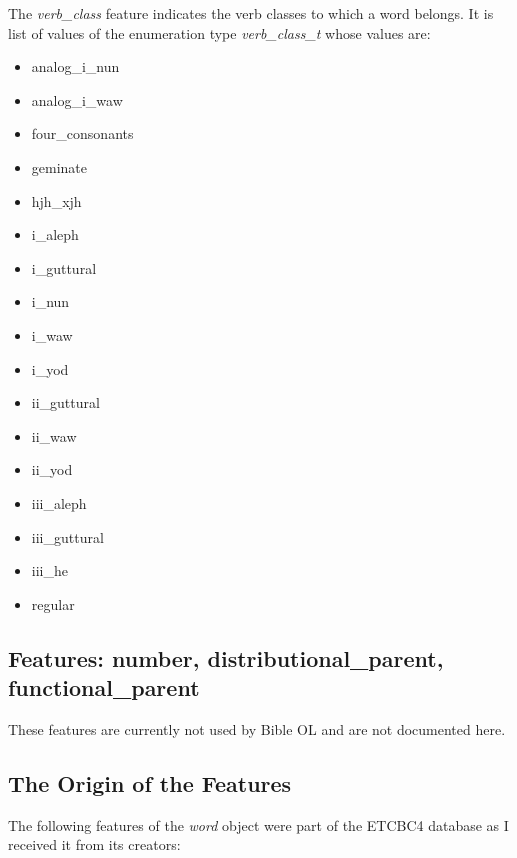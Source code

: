 \documentclass[11pt,oneside,a4paper]{memoir}
\begin{document}
The \emph{verb\_class} feature indicates the verb classes to which a word belongs. It is list of
values of the enumeration type \emph{verb\_class\_t} whose values are:

\begin{itemize}
\item analog\_i\_nun
\item analog\_i\_waw
\item four\_consonants
\item geminate
\item hjh\_xjh
\item i\_aleph
\item i\_guttural
\item i\_nun
\item i\_waw
\item i\_yod
\item ii\_guttural
\item ii\_waw
\item ii\_yod
\item iii\_aleph
\item iii\_guttural
\item iii\_he
\item regular
\end{itemize}

\subsection{Features: number, distributional\_parent, functional\_parent}

These features are currently not used by Bible OL and are not documented here.

\subsection{The Origin of the Features}\label{etcbc-origin}

The following features of the \emph{word} object were part of the ETCBC4 database as I received it
from its creators:
\end{document}
